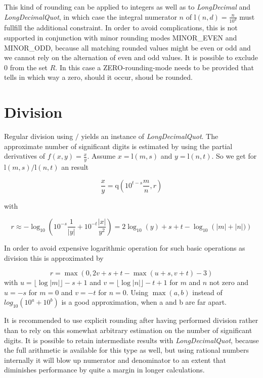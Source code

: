\documentclass[10pt,a4paper]{article}
\def\ld{\mathrm l}
\def\ldq{\mathrm q}
\begin{document}
This kind of rounding can be applied to integers as well as to
{\slshape LongDecimal\/} and {\slshape LongDecimalQuot\/}, in which case the integral numerator
$n$ of $\ld(n, d)=\frac{n}{10^d}$ must fullfill the additional
constraint.  In order to avoid complications, this is not supported in
conjunction with minor rounding modes MINOR\_EVEN and MINOR\_ODD,
because all matching rounded values might be even or odd and we cannot
rely on the alternation of even and odd values.
It is possible to exclude $0$ from the set $R$. In this case a
ZERO-rounding-mode needs to be provided that tells in which way a
zero, should it occur, shoud be rounded.

\pagebreak

\section{Division}

Regular division using $/$ yields an instance of {\slshape LongDecimalQuot\/}.  The approximate number of significant digits is estimated by using the partial derivatives of $f(x, y) = \frac{x}{y}$.
Assume $x=\ld(m, s)$ and $y=\ld(n, t)$.  So we get for $\ld(m, s) / \ld(n, t)$ an result 

$$\frac{x}{y} = \ldq(10^{t-s}\frac{m}{n}, r)$$

with 

$$r \approx -\log_{10}\left(10^{-s} \frac{1}{|y|} + 10^{-t} \frac{|x|}{y^2}\right) 
    =  2 \log_{10}(y) + s + t -\log_{10}\left(|m| + |n|) \right)$$

In order to avoid expensive logarithmic operation for such basic operations as division this is approximated by

$$r = \max( 0, 2 v + s + t - \max( u + s, v + t) - 3)$$
with $u = \lfloor\log |m| \rfloor - s + 1$ and $v = \lfloor\log |n| \rfloor - t + 1$ for $m$ and $n$ not zero 
and $u=-s$ for $m = 0$ and $v=-t$ for $n=0$.  Using $\max(a, b)$ instead of $log_{10}(10^a + 10^b)$ is a good approximation, when a and b are far apart.

It is recommended to use explicit rounding after having performed
division rather than to rely on this somewhat arbitrary estimation on
the number of significant digits.  It is possible to retain
intermediate results with {\slshape LongDecimalQuot\/}, because the
full arithmetic is available for this type as well, but using rational
numbers internally it will blow up numerator and denominator to an
extent that diminishes performance by quite a margin in longer
calculations.
\end{document}
